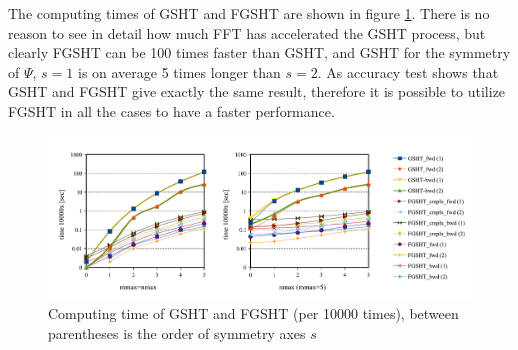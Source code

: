 The computing times of GSHT and FGSHT are shown in figure \ref{fig:time-gsht-fgsht}.
There is no reason to see in detail how much FFT has accelerated
the GSHT process, but clearly FGSHT can be 100 times faster than GSHT,
and GSHT for the symmetry of $\Psi$, $s=1$ is on average 5 times
longer than $s=2$. As accuracy test shows that GSHT and FGSHT give
exactly the same result, therefore it is possible to utilize FGSHT in all the cases
to have a faster performance.
\begin{center}
\begin{figure}[H]
\begin{centering}
\includegraphics[bb=0bp 20bp 731bp 263bp,width=1\columnwidth]{_figure/results/fgsht_perf}
\par\end{centering}
\caption{Computing time of GSHT and FGSHT (per 10000 times), between parentheses
is the order of symmetry axes $s$\label{fig:time-gsht-fgsht}}
\end{figure}
\par\end{center}

